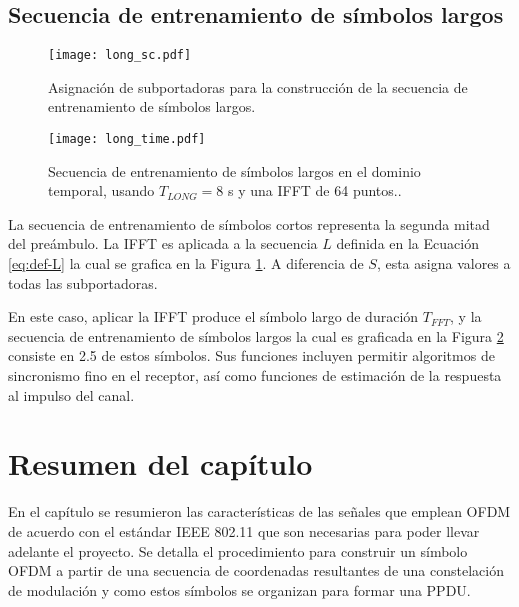 \subsection{Secuencia de entrenamiento de símbolos largos}
\label{Ss:ch2-long}
    
\begin{figure}[t]
    \centering{}\texttt{[image: long\_sc.pdf]}
    \caption{Asignación de subportadoras para la construcción de la secuencia de entrenamiento de símbolos largos.\label{fig:long-sc}}
\end{figure}
\begin{figure}[t]
    \centering{}\texttt{[image: long\_time.pdf]}
    \caption{Secuencia de entrenamiento de símbolos largos en el dominio temporal, usando $T_{LONG} = 8$ \textmu s y una IFFT de 64 puntos..\label{fig:long-time}}  
\end{figure}

La secuencia de entrenamiento de símbolos cortos representa la segunda mitad del preámbulo. La IFFT es aplicada a la secuencia $L$ definida en la Ecuación \ref{eq:def-L} la cual se grafica en la Figura \ref{fig:long-sc}. A diferencia de $S$, esta asigna valores a todas las subportadoras.

En este caso, aplicar la IFFT produce el símbolo largo de duración $T_{FFT}$, y la secuencia de entrenamiento de símbolos largos la cual es graficada en la Figura \ref{fig:long-time} consiste en 2.5 de estos símbolos. Sus funciones incluyen permitir algoritmos de sincronismo fino en el receptor, así como funciones de estimación de la respuesta al impulso del canal.


\section{Resumen del capítulo}

En el capítulo se resumieron las características de las señales que emplean OFDM de acuerdo con el estándar IEEE 802.11 que son necesarias para poder llevar adelante el proyecto. Se detalla el procedimiento para construir un símbolo OFDM a partir de una secuencia de coordenadas resultantes de una constelación de modulación y como estos símbolos se organizan para formar una PPDU.

